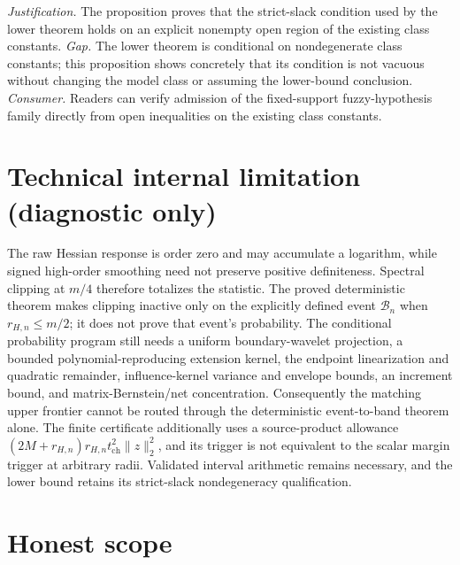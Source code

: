 \documentclass{article}
\begin{document}
\par\smallskip\noindent \textit{Justification.} The proposition proves that the strict-slack condition used by the lower theorem holds on an explicit nonempty open region of the existing class constants. \textit{Gap.} The lower theorem is conditional on nondegenerate class constants; this proposition shows concretely that its condition is not vacuous without changing the model class or assuming the lower-bound conclusion. \textit{Consumer.} Readers can verify admission of the fixed-support fuzzy-hypothesis family directly from open inequalities on the existing class constants.

\section*{Technical internal limitation (diagnostic only)}

The raw Hessian response is order zero and may accumulate a logarithm, while signed high-order smoothing need not preserve positive definiteness. Spectral clipping at \(m/4\) therefore totalizes the statistic. The proved deterministic theorem makes clipping inactive only on the explicitly defined event \(\mathcal B_n\) when \(r_{H,n}\le m/2\); it does not prove that event's probability. The conditional probability program still needs a uniform boundary-wavelet projection, a bounded polynomial-reproducing extension kernel, the endpoint linearization and quadratic remainder, influence-kernel variance and envelope bounds, an increment bound, and matrix-Bernstein/net concentration. Consequently the matching upper frontier cannot be routed through the deterministic event-to-band theorem alone. The finite certificate additionally uses a source-product allowance \((2M+r_{H,n})r_{H,n}t_{\mathrm{ch}}^2\lVert z\rVert_2^2\), and its trigger is not equivalent to the scalar margin trigger at arbitrary radii. Validated interval arithmetic remains necessary, and the lower bound retains its strict-slack nondegeneracy qualification.

\section{Honest scope}
\end{document}
